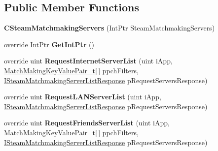 \subsection*{Public Member Functions}
\begin{DoxyCompactItemize}
\item 
\hypertarget{classValve_1_1Steamworks_1_1CSteamMatchmakingServers_ac1ea0ed29903a32dc25797635ac0b31b}{}{\bfseries C\+Steam\+Matchmaking\+Servers} (Int\+Ptr Steam\+Matchmaking\+Servers)\label{classValve_1_1Steamworks_1_1CSteamMatchmakingServers_ac1ea0ed29903a32dc25797635ac0b31b}

\item 
\hypertarget{classValve_1_1Steamworks_1_1CSteamMatchmakingServers_a2c15c3675ddf668f33d5fb7839b5105f}{}override Int\+Ptr {\bfseries Get\+Int\+Ptr} ()\label{classValve_1_1Steamworks_1_1CSteamMatchmakingServers_a2c15c3675ddf668f33d5fb7839b5105f}

\item 
\hypertarget{classValve_1_1Steamworks_1_1CSteamMatchmakingServers_a6b8afa4f49e44d04ccf7c12a4ab0ce08}{}override uint {\bfseries Request\+Internet\+Server\+List} (uint i\+App, \hyperlink{structValve_1_1Steamworks_1_1MatchMakingKeyValuePair__t}{Match\+Making\+Key\+Value\+Pair\+\_\+t}\mbox{[}$\,$\mbox{]} ppch\+Filters, \hyperlink{classValve_1_1Steamworks_1_1ISteamMatchmakingServerListResponse}{I\+Steam\+Matchmaking\+Server\+List\+Response} p\+Request\+Servers\+Response)\label{classValve_1_1Steamworks_1_1CSteamMatchmakingServers_a6b8afa4f49e44d04ccf7c12a4ab0ce08}

\item 
\hypertarget{classValve_1_1Steamworks_1_1CSteamMatchmakingServers_a1181bb73f46d56daa3b9dd31cd3c1385}{}override uint {\bfseries Request\+L\+A\+N\+Server\+List} (uint i\+App, \hyperlink{classValve_1_1Steamworks_1_1ISteamMatchmakingServerListResponse}{I\+Steam\+Matchmaking\+Server\+List\+Response} p\+Request\+Servers\+Response)\label{classValve_1_1Steamworks_1_1CSteamMatchmakingServers_a1181bb73f46d56daa3b9dd31cd3c1385}

\item 
\hypertarget{classValve_1_1Steamworks_1_1CSteamMatchmakingServers_a327298c9ebdb3d677aa5400c29863da8}{}override uint {\bfseries Request\+Friends\+Server\+List} (uint i\+App, \hyperlink{structValve_1_1Steamworks_1_1MatchMakingKeyValuePair__t}{Match\+Making\+Key\+Value\+Pair\+\_\+t}\mbox{[}$\,$\mbox{]} ppch\+Filters, \hyperlink{classValve_1_1Steamworks_1_1ISteamMatchmakingServerListResponse}{I\+Steam\+Matchmaking\+Server\+List\+Response} p\+Request\+Servers\+Response)\label{classValve_1_1Steamworks_1_1CSteamMatchmakingServers_a327298c9ebdb3d677aa5400c29863da8}


\end{DoxyCompactItemize}
